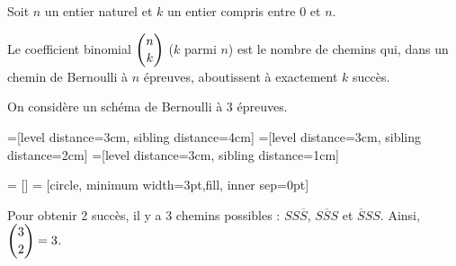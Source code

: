 \documentclass[11pt,fleqn, openany]{book} %
\begin{document}
\begin{definition}Soit $n$ un entier naturel et $k$ un entier compris entre 0 et $n$. 

Le coefficient binomial $\dbinom{n}{k}$ ($k$ parmi $n$) est le nombre de chemins qui, dans un chemin de Bernoulli à $n$ épreuves, aboutissent à exactement $k$ succès.\end{definition}

\begin{example} On considère un schéma de Bernoulli à 3 épreuves.

=[level distance=3cm, sibling distance=4cm]
=[level distance=3cm, sibling distance=2cm]
=[level distance=3cm, sibling distance=1cm]

 = []
 = [circle, minimum width=3pt,fill, inner sep=0pt]

\begin{center}
\end{center}

Pour obtenir 2 succès, il y a 3 chemins possibles : $SS\overline{S}$, $S\overline{S}S$ et $\overline{S}SS$. Ainsi, $\dbinom{3}{2} = 3$.

\end{example}
\end{document}
